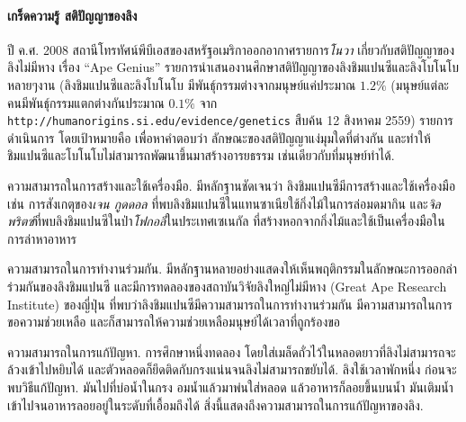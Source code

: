 


{\small
\begin{shaded}
\paragraph{\small เกร็ดความรู้ สติปัญญาของลิง}
ปี ค.ศ. 2008 สถานีโทรทัศน์พีบีเอสของสหรัฐอเมริกาออกอากาศรายการ\textit{โนวา} เกี่ยวกับสติปัญญาของลิงไม่มีหาง เรื่อง ``Ape Genius''
รายการนำเสนองานศึกษาสติปัญญาของลิงชิมแปนซีและลิงโบโนโบหลายๆงาน (ลิงชิมแปนซีและลิงโบโนโบ มีพันธุ์กรรมต่างจากมนุษย์แค่ประมาณ $1.2\%$
(มนุษย์แต่ละคนมีพันธุ์กรรมแตกต่างกันประมาณ $0.1\%$
จาก \verb|http://humanorigins.si.edu/evidence/genetics| สืบค้น 12 สิงหาคม 2559)
รายการดำเนินการ โดยเป้าหมายคือ เพื่อหาคำตอบว่า ลักษณะของสติปัญญาแง่มุมใดที่ต่างกัน และทำให้ชิมแปนซีและโบโนโบไม่สามารถพัฒนาขึ้นมาสร้างอารยธรรม เช่นเดียวกับที่มนุษย์ทำได้.

ความสามารถในการสร้างและใช้เครื่องมือ.
มีหลักฐานชัดเจนว่า ลิงชิมแปนซีมีการสร้างและใช้เครื่องมือ เช่น การสังเกตุของ\textit{เจน กูดดอล} ที่พบลิงชิมแปนซีในแทนซาเนียใช้กิ่งไม้ในการล่อมดมากิน
และ\textit{จิล พริตซ์}ที่พบลิงชิมแปนซีในป่า\textit{โฟกอลี}ในประเทศเซเนกัล ที่สร้างหอกจากกิ่งไม้และใช้เป็นเครื่องมือในการล่าหาอาหาร

ความสามารถในการทำงานร่วมกัน.
มีหลักฐานหลายอย่างแสดงให้เห็นพฤติกรรมในลักษณะการออกล่าร่วมกันของลิงชิมแปนซี
และมีการทดลองของสถาบันวิจัยลิงใหญ่ไม่มีหาง (Great Ape Research Institute) ของญี่ปุ่น
ที่พบว่าลิงชิมแปนซีมีความสามารถในการทำงานร่วมกัน มีความสามารถในการขอความช่วยเหลือ และก็สามารถให้ความช่วยเหลือมนุษย์ได้เวลาที่ถูกร้องขอ

ความสามารถในการแก้ปัญหา.
การศึกษาหนึ่งทดลอง โดยใส่เมล็ดถั่วไว้ในหลอดยาวที่ลิงไม่สามารถจะล้วงเข้าไปหยิบได้
และตัวหลอดก็ยึดติดกับกรงแน่นจนลิงไม่สามารถขยับได้.
ลิงใช้เวลาพักหนึ่ง ก่อนจะพบวิธีแก้ปัญหา.
มันไปที่บ่อน้ำในกรง อมน้ำแล้วมาพ่นใส่หลอด แล้วอาหารก็ลอยขึ้นบนน้ำ 
มันเติมน้ำเข้าไปจนอาหารลอยอยู่ในระดับที่เอื้อมถึงได้
สิ่งนี้แสดงถึงความสามารถในการแก้ปัญหาของลิง.


\end{shaded}}
